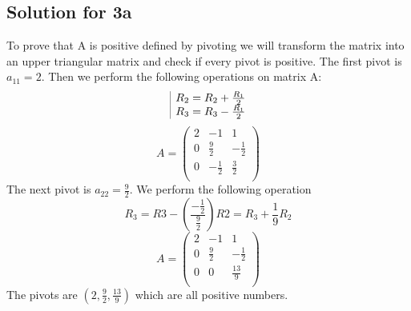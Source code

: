 \documentclass[a4paper,fleqn,12pt]{article}
\begin{document}
\subsection{Solution for 3a}
To prove that A is positive defined by pivoting we will transform the matrix into an upper triangular matrix and check if every pivot is positive. The first pivot is $a_{11} = 2$. Then we perform the following operations on matrix A: 
$$
\begin{array}{|l@{}}
	R_2 = R_2 + \frac{R_1}{2} \\
	R_3 = R_3 - \frac{R_1}{2}
\end{array}
$$
$$
A = \begin{pmatrix}
2 & -1 & 1 \\
0 & \frac{9}{2} & -\frac{1}{2} \\
0 & -\frac{1}{2} & \frac{3}{2} \\
\end{pmatrix}
$$
The next pivot is $a_{22} = \frac{9}{2}$. We perform the following operation
$$
R_3 = R3 - \left(\frac{-\frac{1}{2}}{\frac{9}{2}}\right)R2 = R_3 + \frac{1}{9} R_2
$$
$$
A = \begin{pmatrix}
2 & -1 & 1 \\
0 & \frac{9}{2} & -\frac{1}{2} \\
0 & 0 & \frac{13}{9} \\
\end{pmatrix}
$$
The pivots are $\left( 2, \frac{9}{2}, \frac{13}{9} \right)$ which are all positive numbers.
\newpage
\end{document}
